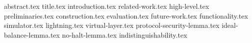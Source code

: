 \documentclass[format=sigconf, anonymous=false]{acmart}
\begin{document}
\pagestyle{plain}

{abstract.tex}
{title.tex}
{introduction.tex}
{related-work.tex}
{high-level.tex}
{preliminaries.tex}
{construction.tex}
{evaluation.tex}
{future-work.tex}
{functionality.tex}
{simulator.tex}
{lightning.tex}
{virtual-layer.tex}
{protocol-security-lemma.tex}
{ideal-balance-lemma.tex}
{no-halt-lemma.tex}
{indistinguishability.tex}


\end{document}

